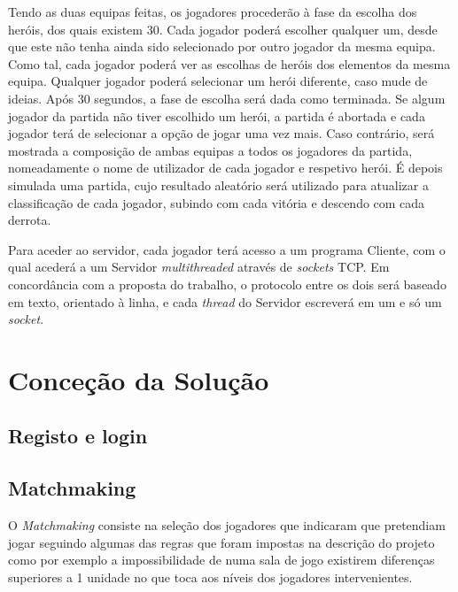 \documentclass[a4paper]{article}
\begin{document}
\par Tendo as duas equipas feitas, os jogadores procederão à fase da escolha dos heróis, dos quais existem 30. Cada jogador poderá escolher qualquer um, desde que este não tenha ainda sido selecionado por outro jogador da mesma equipa. Como tal, cada jogador poderá ver as escolhas de heróis dos elementos da mesma equipa. Qualquer jogador poderá selecionar um herói diferente, caso mude de ideias. Após 30 segundos, a fase de escolha será dada como terminada. Se algum jogador da partida não tiver escolhido um herói, a partida é abortada e cada jogador terá de selecionar a opção de jogar uma vez mais. Caso contrário, será mostrada a composição de ambas equipas a todos os jogadores da partida, nomeadamente o nome de utilizador de cada jogador e respetivo herói. É depois simulada uma partida, cujo resultado aleatório será utilizado para atualizar a classificação de cada jogador, subindo com cada vitória e descendo com cada derrota.

\par Para aceder ao servidor, cada jogador terá acesso a um programa Cliente, com o qual acederá a um Servidor \textit{multithreaded} através de \textit{sockets} TCP. Em concordância com a proposta do trabalho, o protocolo entre os dois será baseado em texto, orientado à linha, e cada \textit{thread} do Servidor escreverá em um e só um \textit{socket}.


\pagebreak
\clearpage

\section{Conceção da Solução}
\label{sec:3}

\subsection{Registo e login}
\label{sec:3.1}
\hspace{3mm} 



\subsection{Matchmaking}
\label{sec:3.2}

\hspace{3mm} O \textit{Matchmaking} consiste na seleção dos jogadores que indicaram que pretendiam jogar seguindo algumas das regras que foram impostas na descrição do projeto como por exemplo a impossibilidade de numa sala de jogo existirem diferenças superiores a 1 unidade no que toca aos níveis dos jogadores intervenientes.
\end{document}
